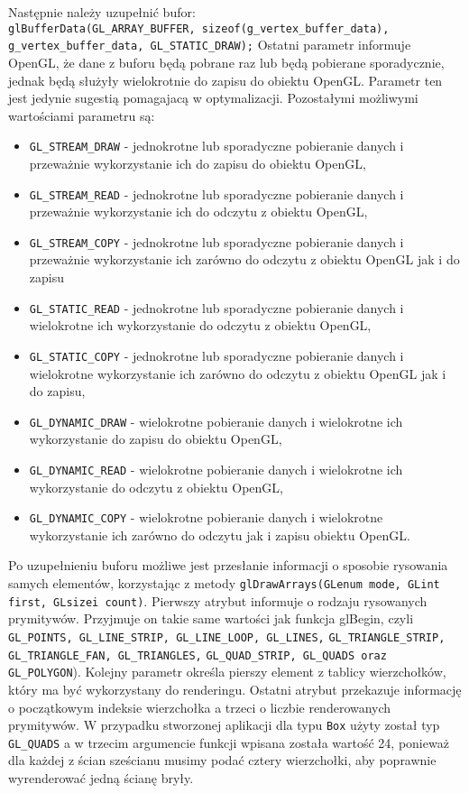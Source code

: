 Następnie należy uzupełnić bufor: \\
\verb$glBufferData(GL_ARRAY_BUFFER, sizeof(g_vertex_buffer_data),$
\verb$g_vertex_buffer_data, GL_STATIC_DRAW);$
Ostatni parametr informuje OpenGL, że dane z buforu będą pobrane raz lub będą pobierane sporadycznie, jednak będą służyły wielokrotnie do zapisu do obiektu OpenGL. Parametr ten jest jedynie sugestią pomagajacą w optymalizacji. Pozostałymi możliwymi wartościami parametru są:
\begin{itemize}
\item \verb$GL_STREAM_DRAW$ - jednokrotne lub sporadyczne pobieranie danych i przeważnie wykorzystanie ich do zapisu do obiektu OpenGL,
\item \verb$GL_STREAM_READ$ - jednokrotne lub sporadyczne pobieranie danych i przeważnie wykorzystanie ich do odczytu z obiektu OpenGL,
\item \verb$GL_STREAM_COPY$ - jednokrotne lub sporadyczne pobieranie danych i przeważnie wykorzystanie ich zarówno do odczytu z obiektu OpenGL jak i do zapisu
\item \verb$GL_STATIC_READ$ - jednokrotne lub sporadyczne pobieranie danych i wielokrotne ich wykorzystanie do odczytu z obiektu OpenGL,
\item \verb$GL_STATIC_COPY$ - jednokrotne lub sporadyczne pobieranie danych i wielokrotne wykorzystanie ich zarówno do odczytu z obiektu OpenGL jak i do zapisu,
\item \verb$GL_DYNAMIC_DRAW$ - wielokrotne pobieranie danych i wielokrotne ich wykorzystanie do zapisu do obiektu OpenGL,
\item \verb$GL_DYNAMIC_READ$ - wielokrotne pobieranie danych i wielokrotne ich wykorzystanie do odczytu z obiektu OpenGL,
\item \verb$GL_DYNAMIC_COPY$ - wielokrotne pobieranie danych i wielokrotne wykorzystanie ich zarówno do odczytu jak i zapisu obiektu OpenGL.
\end{itemize}
Po uzupełnieniu buforu możliwe jest przesłanie informacji o sposobie rysowania samych elementów, korzystając z metody \verb$glDrawArrays(GLenum mode, GLint first, GLsizei count)$. Pierwszy atrybut informuje o rodzaju rysowanych prymitywów. Przyjmuje on takie same wartości jak funkcja glBegin, czyli \verb$GL_POINTS, GL_LINE_STRIP, GL_LINE_LOOP, GL_LINES,$
\verb$GL_TRIANGLE_STRIP, GL_TRIANGLE_FAN, GL_TRIANGLES,$
\verb$GL_QUAD_STRIP, GL_QUADS oraz GL_POLYGON$). Kolejny parametr określa pierszy element z tablicy wierzchołków, który ma być wykorzystany do renderingu. Ostatni atrybut przekazuje informację o początkowym indeksie wierzchołka a trzeci o liczbie renderowanych prymitywów. W przypadku stworzonej aplikacji dla typu \verb$Box$ użyty został typ \verb$GL_QUADS$ a w trzecim argumencie funkcji wpisana została wartość 24, ponieważ dla każdej z ścian sześcianu musimy podać cztery wierzchołki, aby poprawnie wyrenderować jedną ścianę bryły.
